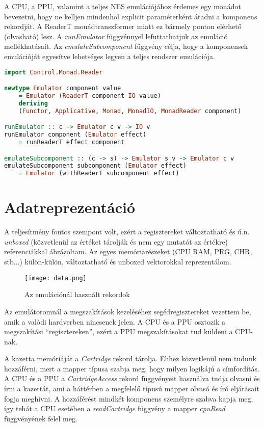 A CPU, a PPU, valamint a teljes NES emulációjához érdemes egy monádot bevezetni, hogy ne kelljen mindenhol explicit paraméterként átadni a komponens rekordját. A ReaderT monádtranszformer miatt ez bármely ponton elérhető (olvasható) lesz. A \emph{runEmulator} függvénnyel lefuttathatjuk az emuláció mellékhatásait. Az \emph{emulateSubcomponent} függvény célja, hogy a komponensek emulációját egyesítve lehetséges legyen a teljes rendszer emulációja.
\vspace{0.2cm}
\begin{lstlisting}[language=Haskell, basicstyle=\scriptsize]
import Control.Monad.Reader

newtype Emulator component value 
	= Emulator (ReaderT component IO value) 
	deriving 
	(Functor, Applicative, Monad, MonadIO, MonadReader component)

runEmulator :: c -> Emulator c v -> IO v
runEmulator component (Emulator effect) 
	= runReaderT effect component

emulateSubcomponent :: (c -> s) -> Emulator s v -> Emulator c v
emulateSubcomponent subcomponent (Emulator effect) 
	= Emulator (withReaderT subcomponent effect)
\end{lstlisting}

\section{Adatreprezentáció}

A teljesítmény fontos szempont volt, ezért a regisztereket változtatható és ú.n. \emph{unboxed} (közvetlenül az értéket tárolják és nem egy mutatót az értékre) referenciákkal ábrázoltam. Az egyes memóriarészeket (CPU RAM, PRG, CHR, stb...) külön-külön, változtatható és unboxed vektorokkal reprezentálom.

\begin{figure}[H]
	\centering
	\texttt{[image: data.png]}
	\caption{Az emulációnál használt rekordok}
\end{figure}

Az emulátoromnál a megszakítások kezeléséhez segédregisztereket vezettem be, amik a valódi hardverben nincsenek jelen. A CPU és a PPU osztozik a megszakítási ``regisztereken'', ezért a PPU megszakításokat tud küldeni a CPU-nak.

A kazetta memóriáját a \emph{Cartridge} rekord tárolja. Ehhez közvetlenül nem tudunk hozzáférni, mert a mapper típusa szabja meg, hogy milyen logikájú a címfordítás. A CPU és a PPU a \emph{CartridgeAccess} rekord függvényeit használva tudja olvasni és írni a kazettát, ami a háttérben a megfelelő típusú mapper olvasó és író eljárásait fogja meghívni. A hozzáférést mindkét komponens személyre szabva kapja meg, így tehát a CPU esetében a \emph{readCartridge} függvény a mapper \emph{cpuRead} függvényének felel meg.

